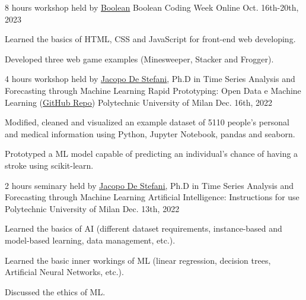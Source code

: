 \begin{cventries}
  \cventry
    {8 hours workshop held by \underline{\href{https://boolean.careers/}{Boolean}}} %
    {Boolean Coding Week} %
    {Online} %
    {Oct. 16th-20th, 2023} %
    {
      \begin{cvitems} %
        \item {Learned the basics of HTML, CSS and JavaScript for front-end web developing.}
        \item {Developed three web game examples (Minesweeper, Stacker and Frogger).}
      \end{cvitems}
    }

  \cventry
    {4 hours workshop held by \underline{\href{https://www.linkedin.com/in/jdestefani/}{Jacopo De Stefani}}, Ph.D in Time Series Analysis and Forecasting through Machine Learning} %
    {Rapid Prototyping: Open Data e Machine Learning (\underline{\href{https://github.com/jdestefani/rapidprototyping-opendata-ml}{GitHub Repo}})} %
    {Polytechnic University of Milan} %
    {Dec. 16th, 2022} %
    {
      \begin{cvitems} %
        \item {Modified, cleaned and visualized an example dataset of 5110 people's personal and medical information using Python, Jupyter Notebook, pandas and seaborn.}
        \item {Prototyped a ML model capable of predicting an individual's chance of having a stroke using scikit-learn.}
      \end{cvitems}
    }

  \cventry
    {2 hours seminary held by \underline{\href{https://www.linkedin.com/in/jdestefani/}{Jacopo De Stefani}}, Ph.D in Time Series Analysis and Forecasting through Machine Learning} %
    {Artificial Intelligence: Instructions for use} %
    {Polytechnic University of Milan} %
    {Dec. 13th, 2022} %
    {
      \begin{cvitems} %
        \item {Learned the basics of AI (different dataset requirements, instance-based and model-based learning, data management, etc.).}
        \item {Learned the basic inner workings of ML (linear regression, decision trees, Artificial Neural Networks, etc.).}
        \item {Discussed the ethics of ML.}
      \end{cvitems}
    }


\end{cventries}
